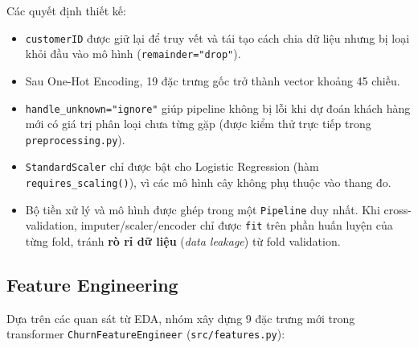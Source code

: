 Các quyết định thiết kế:
\begin{itemize}
    \item \texttt{customerID} được giữ lại để truy vết và tái tạo cách chia dữ liệu nhưng bị loại khỏi đầu vào mô hình (\texttt{remainder="drop"}).
    \item Sau One-Hot Encoding, 19 đặc trưng gốc trở thành vector khoảng 45 chiều.
    \item \texttt{handle\_unknown="ignore"} giúp pipeline không bị lỗi khi dự đoán khách hàng mới có giá trị phân loại chưa từng gặp (được kiểm thử trực tiếp trong \texttt{preprocessing.py}).
    \item \texttt{StandardScaler} chỉ được bật cho Logistic Regression (hàm \texttt{requires\_scaling()}), vì các mô hình cây không phụ thuộc vào thang đo.
    \item Bộ tiền xử lý và mô hình được ghép trong một \texttt{Pipeline} duy nhất. Khi cross-validation, imputer/scaler/encoder chỉ được \texttt{fit} trên phần huấn luyện của từng fold, tránh \textbf{rò rỉ dữ liệu} (\textit{data leakage}) từ fold validation.
\end{itemize}

\subsection{Feature Engineering}
Dựa trên các quan sát từ EDA, nhóm xây dựng 9 đặc trưng mới trong transformer \texttt{ChurnFeatureEngineer} (\texttt{src/features.py}):

